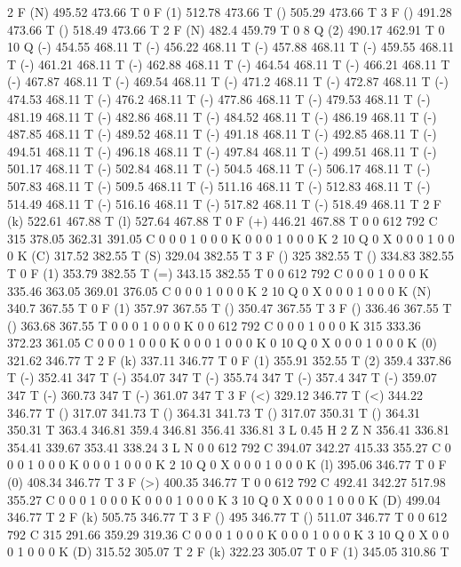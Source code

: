 2 F
(N) 495.52 473.66 T
0 F
(1) 512.78 473.66 T
() 505.29 473.66 T
3 F
() 491.28 473.66 T
() 518.49 473.66 T
2 F
(N) 482.4 459.79 T
0 8 Q
(2) 490.17 462.91 T
0 10 Q
(-) 454.55 468.11 T
(-) 456.22 468.11 T
(-) 457.88 468.11 T
(-) 459.55 468.11 T
(-) 461.21 468.11 T
(-) 462.88 468.11 T
(-) 464.54 468.11 T
(-) 466.21 468.11 T
(-) 467.87 468.11 T
(-) 469.54 468.11 T
(-) 471.2 468.11 T
(-) 472.87 468.11 T
(-) 474.53 468.11 T
(-) 476.2 468.11 T
(-) 477.86 468.11 T
(-) 479.53 468.11 T
(-) 481.19 468.11 T
(-) 482.86 468.11 T
(-) 484.52 468.11 T
(-) 486.19 468.11 T
(-) 487.85 468.11 T
(-) 489.52 468.11 T
(-) 491.18 468.11 T
(-) 492.85 468.11 T
(-) 494.51 468.11 T
(-) 496.18 468.11 T
(-) 497.84 468.11 T
(-) 499.51 468.11 T
(-) 501.17 468.11 T
(-) 502.84 468.11 T
(-) 504.5 468.11 T
(-) 506.17 468.11 T
(-) 507.83 468.11 T
(-) 509.5 468.11 T
(-) 511.16 468.11 T
(-) 512.83 468.11 T
(-) 514.49 468.11 T
(-) 516.16 468.11 T
(-) 517.82 468.11 T
(-) 518.49 468.11 T
2 F
(k) 522.61 467.88 T
(l) 527.64 467.88 T
0 F
(+) 446.21 467.88 T
0 0 612 792 C
315 378.05 362.31 391.05 C
0 0 0 1 0 0 0 K
0 0 0 1 0 0 0 K
2 10 Q
0 X
0 0 0 1 0 0 0 K
(C) 317.52 382.55 T
(S) 329.04 382.55 T
3 F
() 325 382.55 T
() 334.83 382.55 T
0 F
(1) 353.79 382.55 T
(=) 343.15 382.55 T
0 0 612 792 C
0 0 0 1 0 0 0 K
335.46 363.05 369.01 376.05 C
0 0 0 1 0 0 0 K
2 10 Q
0 X
0 0 0 1 0 0 0 K
(N) 340.7 367.55 T
0 F
(1) 357.97 367.55 T
() 350.47 367.55 T
3 F
() 336.46 367.55 T
() 363.68 367.55 T
0 0 0 1 0 0 0 K
0 0 612 792 C
0 0 0 1 0 0 0 K
315 333.36 372.23 361.05 C
0 0 0 1 0 0 0 K
0 0 0 1 0 0 0 K
0 10 Q
0 X
0 0 0 1 0 0 0 K
(0) 321.62 346.77 T
2 F
(k) 337.11 346.77 T
0 F
(1) 355.91 352.55 T
(2) 359.4 337.86 T
(-) 352.41 347 T
(-) 354.07 347 T
(-) 355.74 347 T
(-) 357.4 347 T
(-) 359.07 347 T
(-) 360.73 347 T
(-) 361.07 347 T
3 F
(<) 329.12 346.77 T
(<) 344.22 346.77 T
() 317.07 341.73 T
() 364.31 341.73 T
() 317.07 350.31 T
() 364.31 350.31 T
363.4 346.81 359.4 346.81 356.41 336.81 3 L
0.45 H
2 Z
N
356.41 336.81 354.41 339.67 353.41 338.24 3 L
N
0 0 612 792 C
394.07 342.27 415.33 355.27 C
0 0 0 1 0 0 0 K
0 0 0 1 0 0 0 K
2 10 Q
0 X
0 0 0 1 0 0 0 K
(l) 395.06 346.77 T
0 F
(0) 408.34 346.77 T
3 F
(>) 400.35 346.77 T
0 0 612 792 C
492.41 342.27 517.98 355.27 C
0 0 0 1 0 0 0 K
0 0 0 1 0 0 0 K
3 10 Q
0 X
0 0 0 1 0 0 0 K
(D) 499.04 346.77 T
2 F
(k) 505.75 346.77 T
3 F
() 495 346.77 T
() 511.07 346.77 T
0 0 612 792 C
315 291.66 359.29 319.36 C
0 0 0 1 0 0 0 K
0 0 0 1 0 0 0 K
3 10 Q
0 X
0 0 0 1 0 0 0 K
(D) 315.52 305.07 T
2 F
(k) 322.23 305.07 T
0 F
(1) 345.05 310.86 T
